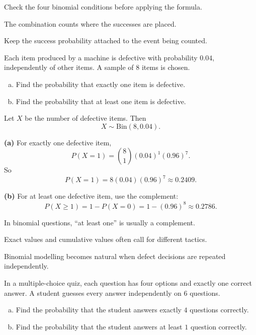 \begin{takeaways}
\item Check the four binomial conditions before applying the formula.
\item The combination counts where the successes are placed.
\item Keep the success probability attached to the event being counted.
\end{takeaways}

\begin{problem}
Each item produced by a machine is defective with probability $0.04$, independently of other items. A sample of $8$ items is chosen.
\begin{enumerate}[(a)]
  \item Find the probability that exactly one item is defective.
  \item Find the probability that at least one item is defective.
\end{enumerate}
\end{problem}

\begin{solution}
Let $X$ be the number of defective items. Then
\[
X\sim \mathrm{Bin}(8,0.04).
\]

\textbf{(a)} For exactly one defective item,
\[
P(X=1)=\binom81(0.04)^1(0.96)^7.
\]
So
\[
P(X=1)=8(0.04)(0.96)^7\approx 0.2409.
\]

\textbf{(b)} For at least one defective item, use the complement:
\[
P(X\ge 1)=1-P(X=0)=1-(0.96)^8\approx 0.2786.
\]
\end{solution}

\begin{takeaways}
\item In binomial questions, ``at least one'' is usually a complement.
\item Exact values and cumulative values often call for different tactics.
\item Binomial modelling becomes natural when defect decisions are repeated independently.
\end{takeaways}

\begin{problem}
In a multiple-choice quiz, each question has four options and exactly one correct answer. A student guesses every answer independently on $6$ questions.
\begin{enumerate}[(a)]
  \item Find the probability that the student answers exactly $4$ questions correctly.
  \item Find the probability that the student answers at least $1$ question correctly.
\end{enumerate}
\end{problem}

